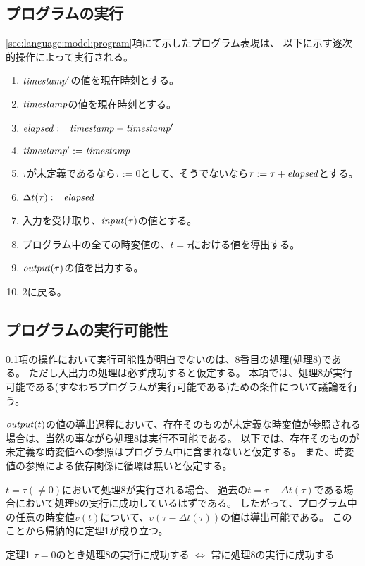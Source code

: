 \subsection{プログラムの実行}\label{sec:language:model:execution}
\ref{sec:language:model:program}項にて示したプログラム表現は、 以下に示す逐次的操作によって実行される。
\begin{screen}
\begin{enumerate}
  \item $ {\it timestamp}^{\prime} $の値を現在時刻とする。
  \item $ {\it timestamp} $の値を現在時刻とする。
  \item $ {\it elapsed} := {\it timestamp} - {\it timestamp}^{\prime} $
  \item $ {\it timestamp}^{\prime} := {\it timestamp} $
  \item $\tau$が未定義であるなら$ \tau := 0 $として、そうでないなら$ \tau := \tau + {\it elapsed} $とする。
  \item $ \Delta t(\tau) := {\it elapsed} $
  \item 入力を受け取り、$ {\it input}(\tau) $の値とする。
  \item プログラム中の全ての時変値の、$t=\tau$における値を導出する。
  \item $ {\it output}(\tau) $の値を出力する。
  \item 2に戻る。
\end{enumerate}
\end{screen}

\subsection{プログラムの実行可能性}\label{sec:language:model:validation}
\ref{sec:language:model:execution}項の操作において実行可能性が明白でないのは、8番目の処理(処理8)である。
ただし入出力の処理は必ず成功すると仮定する。
本項では、処理8が実行可能である(すなわちプログラムが実行可能である)ための条件について議論を行う。

${\it output}(t)$の値の導出過程において、存在そのものが未定義な時変値が参照される場合は、当然の事ながら処理8は実行不可能である。
以下では、存在そのものが未定義な時変値への参照はプログラム中に含まれないと仮定する。
また、時変値の参照による依存関係に循環は無いと仮定する。

$t = \tau (\neq 0)$において処理8が実行される場合、
過去の$t = \tau - \Delta t(\tau)$である場合において処理8の実行に成功しているはずである。
したがって、プログラム中の任意の時変値$v(t)$について、$v(\tau - \Delta t(\tau))$の値は導出可能である。
このことから帰納的に定理1が成り立つ。
\begin{itembox}[l]{定理1}
  $\tau = 0$のとき処理8の実行に成功する $\Longleftrightarrow$ 常に処理8の実行に成功する
\end{itembox}

